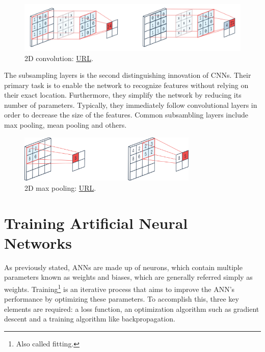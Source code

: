 \begin{figure}[H]
    \centering
        \includegraphics[width=1\textwidth]{Images/ANNArchitectures/2d_convolution.png}
        \decoRule
        \caption[2D convolution]{2D convolution: \href{https://peltarion.com/knowledge-center/documentation/modeling-view/build-an-ai-model/blocks/2d-convolution}{URL}.}
        \label{fig:2D convolution}
\end{figure}

The subsampling layers is the second distinguishing innovation of CNNs. Their primary task is to enable the network to recognize features without relying on their exact location. Furthermore, they simplify the network by reducing its number of parameters. Typically, they immediately follow convolutional layers in order to decrease the size of the features. Common subsambling layers include max pooling, mean pooling and others.

\begin{figure}[H]
    \centering
        \includegraphics[width=0.76\textwidth]{Images/ANNArchitectures/2d_max_pooling.png}
        \decoRule
        \caption[2D max pooling]{2D max pooling: \href{https://peltarion.com/knowledge-center/documentation/modeling-view/build-an-ai-model/blocks/max-pooling-2d}{URL}.}
        \label{fig:2D max pooling}
\end{figure}


\section{Training Artificial Neural Networks}
As previously stated, ANNs are made up of neurons, which contain multiple parameters known as weights and biases, which are generally referred simply as weights. Training\footnote{Also called fitting.} is an iterative process that aims to improve the ANN's performance by optimizing these parameters. To accomplish this, three key elements are required: a loss function, an optimization algorithm such as gradient descent and a training algorithm like backpropagation.

